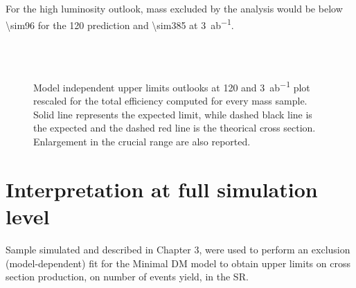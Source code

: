 For the high luminosity outlook, mass excluded by the analysis would be below \SI{\sim96}{\gev} for the \SI{120}{\ifb} prediction and \SI{\sim385}{\gev} at \SI{3}{ab^{-1}}. 



\begin{figure}[tp]
\centering
{} \quad
{} \\
 \quad
{} \\
\caption{Model independent upper limits outlooks at \SI{120}{\ifb} and \SI{3}{ab^{-1}} plot rescaled for the total efficiency computed for every mass sample. Solid line represents the expected limit, while dashed black line is the expected and the dashed red line is the theorical cross section. Enlargement in the crucial range are also reported.}
\label{fig:outlookmi}
\end{figure}


\pagebreak
\section{Interpretation at full simulation level}
\label{sec:full}
Sample simulated and described in Chapter 3, were used to perform an exclusion (model-dependent) fit for the Minimal DM model to obtain upper limits on \chizero cross section production, on number of events yield, in the SR.


